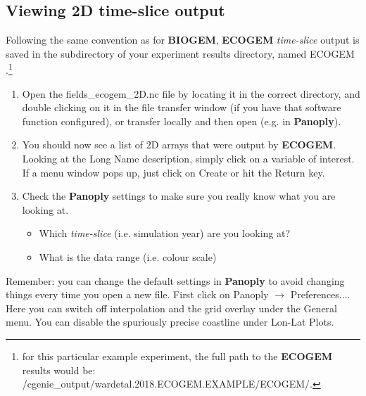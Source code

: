 \documentclass[11pt,fleqn]{book} %
\begin{document}

\subsection{Viewing 2D time-slice output}

Following the same convention as for \textbf{BIOGEM}, \textbf{ECOGEM} \textit{time-slice} output is saved in the subdirectory of your experiment results directory, named \footnotesize\textsf{ECOGEM }\normalsize.\footnote{for this particular example experiment, the full path to the \textbf{ECOGEM} results would be: \\ \scriptsize\textsf{/cgenie\_output/wardetal.2018.ECOGEM.EXAMPLE/ECOGEM/}\normalsize.}

\begin{enumerate}[noitemsep]
\vspace{1mm}
\item Open the \textsf{\footnotesize fields\_ecogem\_2D.nc} file by locating it in the correct directory, and double clicking on it in the file transfer window (if you have that software function configured), or transfer locally and then open (e.g. in \textbf{Panoply}).
\vspace{1mm}
\item You should now see a list of 2D arrays that were output by \textbf{ECOGEM}. Looking at the \textsf{\footnotesize Long Name} description, simply click on a variable of interest. If a menu window pops up, just click on \textsf{\footnotesize Create} or hit the \textsf{\footnotesize Return} key.
\vspace{1mm}
\item Check the \textbf{Panoply} settings to make sure you really know what you are looking at.
\begin{itemize}[noitemsep]
\item Which \textit{time-slice} (i.e. simulation year) are you looking at?
\item What is the data range (i.e. colour scale)
\end{itemize}
\end{enumerate}
\vspace{2mm}

\noindent Remember: you can change the default settings in \textbf{Panoply} to avoid changing things every time you open a new file. First click on \textsf{\footnotesize Panoply} $\rightarrow$ \textsf{\footnotesize Preferences...}. Here you can switch off interpolation and the grid overlay under the \textsf{\footnotesize General} menu. You can disable the spuriously precise coastline under \textsf{\footnotesize Lon-Lat Plots}.
\end{document}

